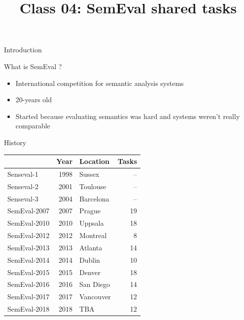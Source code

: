 \documentclass[10pt, compress]{beamer}
\title{Class 04: SemEval shared tasks}
\begin{document}
\maketitle


\begin{frame}{Introduction}

What is SemEval ?
\begin{itemize}
  \item International competition for semantic analysis systems
  \item 20-years old
  \item Started because evaluating semantics was hard and systems
     weren't really comparable
\end{itemize}


\end{frame}


\begin{frame}{History}

\begin{tabular}{lrlr}
           &   \textbf{Year}            & \textbf{Location} & \textbf{Tasks} \\
\hline
Senseval-1  & 	1998    & Sussex  & -- \\
Senseval-2  & 	2001    & Toulouse  & -- \\
Senseval-3  & 	2004    & Barcelona  & -- \\
\hline
SemEval-2007  & 	2007    & Prague & 19  \\
SemEval-2010  & 	2010    & Uppsala & 18  \\
SemEval-2012  & 	2012    & Montreal & 8  \\
SemEval-2013  & 	2013    & Atlanta & 14 \\
SemEval-2014  & 	2014    & Dublin & 10 \\
SemEval-2015  & 	2015    & Denver  & 18 \\
SemEval-2016  & 	2016    & San Diego & 14  \\
SemEval-2017  & 	2017    & Vancouver  & 12 \\
SemEval-2018  & 	2018    & TBA  & 12 \\
\hline
\end{tabular}

\end{frame}
\end{document}
